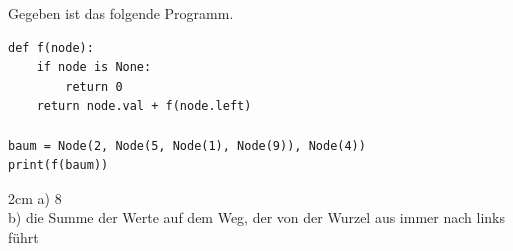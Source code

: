 \question[3]
Gegeben ist das folgende Programm.
\begin{lstlisting}
def f(node):
    if node is None:
        return 0
    return node.val + f(node.left)

baum = Node(2, Node(5, Node(1), Node(9)), Node(4))
print(f(baum))
\end{lstlisting}
\begin{solutionbox}{2cm}
a) 8 \\
b) die Summe der Werte auf dem Weg, der von der Wurzel aus immer nach links führt
\end{solutionbox}
